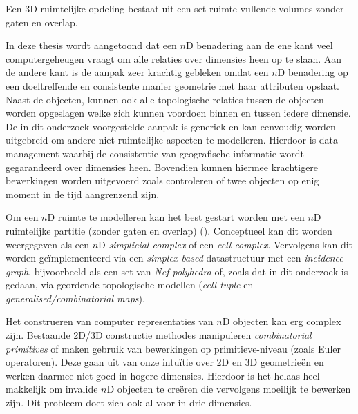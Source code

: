 {{\caption[3D ruimtelijke opdeling]{Een 3D ruimtelijke opdeling bestaat uit een set ruimte-vullende volumes zonder gaten en overlap.}
\label{fig:space-filling-sum-nl}
}
In deze thesis wordt aangetoond dat een $n$D benadering aan de ene kant veel computergeheugen vraagt om alle relaties over dimensies heen op te slaan.
Aan de andere kant is de aanpak zeer krachtig gebleken omdat een $n$D benadering op een doeltreffende en consistente manier geometrie met haar attributen opslaat.
Naast de objecten, kunnen ook alle topologische relaties tussen de objecten worden opgeslagen welke zich kunnen voordoen binnen en tussen iedere dimensie.
De in dit onderzoek voorgestelde aanpak is generiek en kan eenvoudig worden uitgebreid om andere niet-ruimtelijke aspecten te modelleren.
Hierdoor is data management waarbij de consistentie van geografische informatie wordt gegarandeerd over dimensies heen.
Bovendien kunnen hiermee krachtigere bewerkingen worden uitgevoerd zoals controleren of twee objecten op enig moment in de tijd aangrenzend zijn.

Om een $n$D ruimte te modelleren kan het best gestart worden met een $n$D ruimtelijke partitie (zonder gaten en overlap) ().
Conceptueel kan dit worden weergegeven als een $n$D \emph{simplicial complex} of een \emph{cell complex}.
Vervolgens kan dit worden geïmplementeerd via een \emph{simplex-based} datastructuur met een \emph{incidence graph}, bijvoorbeeld als een set van \emph{Nef polyhedra} of, zoals dat in dit onderzoek is gedaan, via geordende topologische modellen (\emph{cell-tuple} en \emph{generalised/combinatorial maps}).

Het construeren van computer representaties van $n$D objecten kan erg complex zijn.
Bestaande 2D/3D constructie methodes manipuleren \emph{combinatorial primitives} of maken gebruik van bewerkingen op primitieve-niveau (zoals Euler operatoren).
Deze gaan uit van onze intuïtie over 2D en 3D geometrieën en werken daarmee niet goed in hogere dimensies.
Hierdoor is het helaas heel makkelijk om invalide $n$D objecten te creëren die vervolgens moeilijk te bewerken zijn.
Dit probleem doet zich ook al voor in drie dimensies.

}
